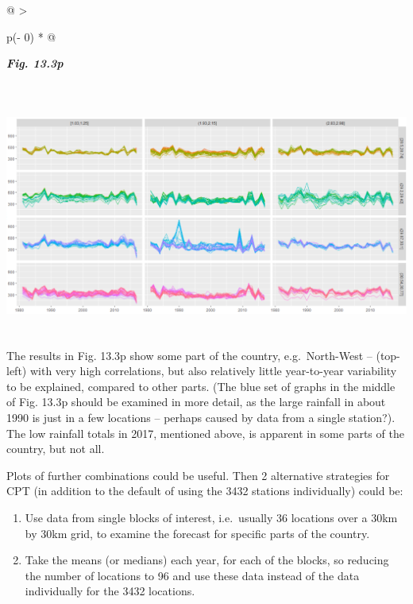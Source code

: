 \documentclass[
  letterpaper,
  DIV=11,
  numbers=noendperiod]{scrreprt}
\begin{document}
\begin{longtable}[]{@{}
  >{\raggedright\arraybackslash}p{(\columnwidth - 0\tabcolsep) * }@{}}
\toprule\noalign{}
\begin{minipage}[b]{\linewidth}\raggedright
\textbf{\emph{Fig. 13.3p}}
\end{minipage} \\
\midrule\noalign{}
\endhead
\bottomrule\noalign{}
\endlastfoot
\includegraphics[width=6.26806in,height=3.08056in]{figures/Fig13.3p.png} \\
\end{longtable}

The results in Fig. 13.3p show some part of the country, e.g.~North-West
-- (top-left) with very high correlations, but also relatively little
year-to-year variability to be explained, compared to other parts. (The
blue set of graphs in the middle of Fig. 13.3p should be examined in
more detail, as the large rainfall in about 1990 is just in a few
locations -- perhaps caused by data from a single station?). The low
rainfall totals in 2017, mentioned above, is apparent in some parts of
the country, but not all.

Plots of further combinations could be useful. Then 2 alternative
strategies for CPT (in addition to the default of using the 3432
stations individually) could be:

\begin{enumerate}
\def\labelenumi{\alph{enumi})}
\item
  Use data from single blocks of interest, i.e.~usually 36 locations
  over a 30km by 30km grid, to examine the forecast for specific parts
  of the country.
\item
  Take the means (or medians) each year, for each of the blocks, so
  reducing the number of locations to 96 and use these data instead of
  the data individually for the 3432 locations.
\end{enumerate}
\end{document}

